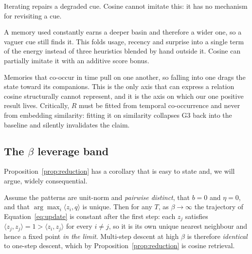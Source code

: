 \begin{description}\itemsep3pt
\item[\textnormal{\textbf{G1} --- depth, $T>1$.}] Iterating repairs a degraded cue.
  Cosine cannot imitate this: it has no mechanism for revisiting a cue.
\item[\textnormal{\textbf{G2} --- basin depth, $b\neq 0$.}] A memory used constantly earns a
  deeper basin and therefore a wider one, so a vaguer cue still finds it. This folds usage,
  recency and surprise into a single term of the energy instead of three heuristics blended
  by hand outside it. Cosine can partially imitate it with an additive score bonus.
\item[\textnormal{\textbf{G3} --- routing, $R\neq I$.}] Memories that co-occur in time pull
  on one another, so falling into one drags the state toward its companions. This is the only
  axis that can express a relation cosine structurally cannot represent, and it is the axis
  on which our one positive result lives. Critically, $R$ must be fitted from temporal
  co-occurrence and never from embedding similarity: fitting it on similarity collapses G3
  back into the baseline and silently invalidates the claim.
\end{description}

\subsection{The $\beta$ leverage band}
\label{sec:band}

Proposition~\ref{prop:reduction} has a corollary that is easy to state and, we will argue,
widely consequential.

\begin{corollary}
\label{cor:degeneracy}
Assume the patterns are unit-norm and \emph{pairwise distinct}, that $b=0$ and $\eta=0$, and
that $\arg\max_i \langle z_i,q\rangle$ is unique. Then for any $T$, as $\beta\to\infty$ the
trajectory of Equation~\eqref{eq:update} is constant after the first step: each $z_j$
satisfies $\langle z_j,z_j\rangle = 1 > \langle z_i,z_j\rangle$ for every $i \neq j$, so it is
its own unique nearest neighbour and hence a fixed point \emph{in the limit}. Multi-step
descent at high $\beta$ is therefore \emph{identical} to one-step descent, which by
Proposition~\ref{prop:reduction} is cosine retrieval.
\end{corollary}

